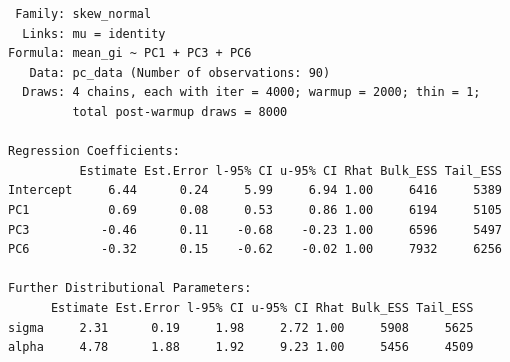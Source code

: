 \documentclass[
  letterpaper,
  DIV=11,
  numbers=noendperiod]{scrartcl}
\begin{document}
\begin{verbatim}
 Family: skew_normal 
  Links: mu = identity 
Formula: mean_gi ~ PC1 + PC3 + PC6 
   Data: pc_data (Number of observations: 90) 
  Draws: 4 chains, each with iter = 4000; warmup = 2000; thin = 1;
         total post-warmup draws = 8000

Regression Coefficients:
          Estimate Est.Error l-95% CI u-95% CI Rhat Bulk_ESS Tail_ESS
Intercept     6.44      0.24     5.99     6.94 1.00     6416     5389
PC1           0.69      0.08     0.53     0.86 1.00     6194     5105
PC3          -0.46      0.11    -0.68    -0.23 1.00     6596     5497
PC6          -0.32      0.15    -0.62    -0.02 1.00     7932     6256

Further Distributional Parameters:
      Estimate Est.Error l-95% CI u-95% CI Rhat Bulk_ESS Tail_ESS
sigma     2.31      0.19     1.98     2.72 1.00     5908     5625
alpha     4.78      1.88     1.92     9.23 1.00     5456     4509


\end{verbatim}
\end{document}
